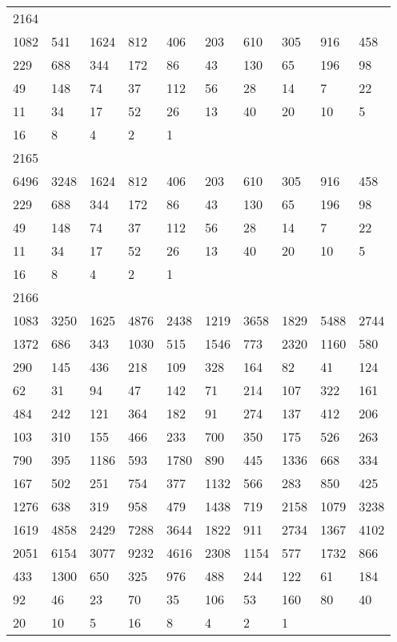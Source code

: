 \begin{longtable}{*{10}{l}}
2164&&&&&&&&&\\
1082& 541& 1624& 812& 406& 203& 610& 305& 916& 458\\
229& 688& 344& 172& 86& 43& 130& 65& 196& 98\\
49& 148& 74& 37& 112& 56& 28& 14& 7& 22\\
11& 34& 17& 52& 26& 13& 40& 20& 10& 5\\
16& 8& 4& 2& 1& \\

2165&&&&&&&&&\\
6496& 3248& 1624& 812& 406& 203& 610& 305& 916& 458\\
229& 688& 344& 172& 86& 43& 130& 65& 196& 98\\
49& 148& 74& 37& 112& 56& 28& 14& 7& 22\\
11& 34& 17& 52& 26& 13& 40& 20& 10& 5\\
16& 8& 4& 2& 1& \\

2166&&&&&&&&&\\
1083& 3250& 1625& 4876& 2438& 1219& 3658& 1829& 5488& 2744\\
1372& 686& 343& 1030& 515& 1546& 773& 2320& 1160& 580\\
290& 145& 436& 218& 109& 328& 164& 82& 41& 124\\
62& 31& 94& 47& 142& 71& 214& 107& 322& 161\\
484& 242& 121& 364& 182& 91& 274& 137& 412& 206\\
103& 310& 155& 466& 233& 700& 350& 175& 526& 263\\
790& 395& 1186& 593& 1780& 890& 445& 1336& 668& 334\\
167& 502& 251& 754& 377& 1132& 566& 283& 850& 425\\
1276& 638& 319& 958& 479& 1438& 719& 2158& 1079& 3238\\
1619& 4858& 2429& 7288& 3644& 1822& 911& 2734& 1367& 4102\\
2051& 6154& 3077& 9232& 4616& 2308& 1154& 577& 1732& 866\\
433& 1300& 650& 325& 976& 488& 244& 122& 61& 184\\
92& 46& 23& 70& 35& 106& 53& 160& 80& 40\\
20& 10& 5& 16& 8& 4& 2& 1& \\


\end{longtable}
